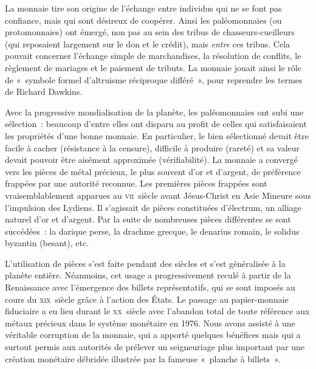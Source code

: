 La monnaie tire son origine de l'échange entre individus qui ne se font pas confiance, mais qui sont désireux de coopérer. Ainsi les paléomonnaies (ou protomonnaies) ont émergé, non pas au sein des tribus de chasseurs-cueilleurs (qui reposaient largement sur le don et le crédit), mais \emph{entre} ces tribus. Cela pouvait concerner l'échange simple de marchandises, la résolution de conflits, le règlement de mariages et le paiement de tributs. La monnaie jouait ainsi le rôle de «~symbole formel d'altruisme réciproque différé~», pour reprendre les termes de Richard Dawkins.

Avec la progressive mondialisation de la planète, les paléomonnaies ont subi une sélection~: beaucoup d'entre elles ont disparu au profit de celles qui satisfaisaient les propriétés d'une bonne monnaie. En particulier, le bien sélectionné devait être facile à cacher (résistance à la censure), difficile à produire (rareté) et sa valeur devait pouvoir être aisément approximée (vérifiabilité). La monnaie a convergé vers les pièces de métal précieux, le plus souvent d'or et d'argent, de préférence frappées par une autorité reconnue. Les premières pièces frappées sont vraisemblablement apparues au \textsc{vii}\ieme{}~siècle avant Jésus-Christ en Asie Mineure sous l'impulsion des Lydiens. Il s'agissait de pièces constituées d'électrum, un alliage naturel d'or et d'argent. Par la suite de nombreuses pièces différentes se sont succédées~: la darique perse, la drachme grecque, le denarius romain, le solidus byzantin (besant), etc.


L'utilisation de pièces s'est faite pendant des siècles et s'est généralisée à la planète entière. Néanmoins, cet usage a progressivement reculé à partir de la Renaissance avec l'émergence des billets représentatifs, qui se sont imposés au cours du \textsc{xix}\ieme{}~siècle grâce à l'action des États. Le passage au papier-monnaie fiduciaire a eu lieu durant le \textsc{xx}\ieme{}~siècle avec l'abandon total de toute référence aux métaux précieux dans le système monétaire en 1976. Nous avons assisté à une véritable corruption de la monnaie, qui a apporté quelques bénéfices mais qui a surtout permis aux autorités de prélever un seigneuriage plus important par une création monétaire débridée illustrée par la fameuse «~planche à billets~».

